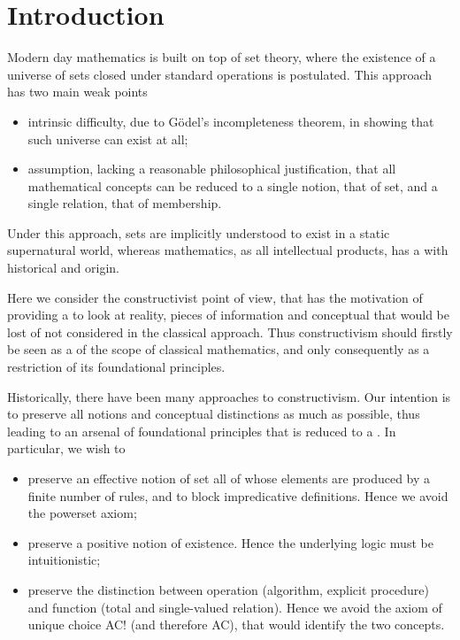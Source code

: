 
\section{Introduction}

Modern day mathematics is built on top of set theory, where the existence of a
universe of sets closed under standard operations is postulated. This approach
has two main weak points

\begin{itemize}
\item intrinsic difficulty, due to G\"odel's incompleteness theorem, in showing
  that such universe can exist at all;
\item assumption, lacking a reasonable philosophical justification, that all
  mathematical concepts can be reduced to a single notion, that of set, and a
  single relation, that of membership.
\end{itemize}

Under this approach, sets are implicitly understood to exist in a static
supernatural world, whereas mathematics, as all intellectual products, has a
 with historical and  origin.

Here we consider the constructivist point of view, that has the motivation of
providing a  to look at reality,  pieces
of information and conceptual  that would be lost of not
considered in the classical approach. Thus constructivism should firstly be seen
as a  of the scope of classical mathematics, and only
consequently as a restriction of its foundational principles.

Historically, there have been many approaches to constructivism. Our intention
is to preserve all notions and conceptual distinctions as much as possible, thus
leading to an arsenal of foundational principles that is reduced to a
. In particular, we wish to

\begin{itemize}
\item preserve an effective notion of set all of whose elements are produced by
  a finite number of rules, and to block impredicative definitions. Hence we
  avoid the powerset axiom;
\item preserve a positive notion of existence. Hence the underlying logic must
  be intuitionistic;
\item preserve the distinction between operation (algorithm, explicit procedure)
  and function (total and single-valued relation). Hence we avoid the axiom of
  unique choice AC! (and therefore AC), that would identify the two concepts.
\end{itemize}

